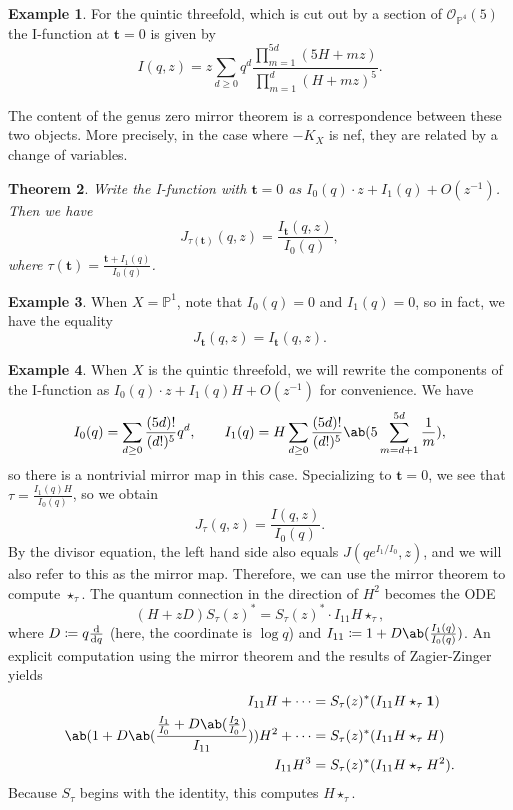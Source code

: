 \documentclass{amsart}
\newtheorem{thm}{Theorem}[section]
\theoremstyle{definition}
\newtheorem{exm}[thm]{Example}
\theoremstyle{remark}
\theoremstyle{plain}
\theoremstyle{definition}
\theoremstyle{remark}
\renewcommand{\P}{\mathbb{P}}
\newcommand{\mc}[1]{\mathcal{#1}}
\newcommand{\mbf}[1]{\mathbf{#1}}
\newcommand{\1}{\mathbf{1}}
\newcommand{\2}{\mathbf{2}}
\newcommand{\3}{\mathbf{3}}
\begin{document}
\begin{exm}
    For the quintic threefold, which is cut out by a section of \(\mc{O}_{\P^4}(5)\)  the I-function at \(\mbf{t} = 0\) is given by
    \[ I(q,z) = z \sum_{d \geq 0} q^d \frac{\prod_{m=1}^{5d}(5H+mz)}{\prod_{m=1}^d (H+mz)^5}. \]
\end{exm}

The content of the genus zero mirror theorem is a correspondence between these two objects. More precisely, in the case where \(-K_X\) is nef, they are related by a change of variables.

\begin{thm}
    Write the I-function with \(\mbf{t} = 0\) as \(I_0(q) \cdot z + I_1(q) + O(z^{-1})\). Then we have 
    \[
        J_{\tau(\mbf{t})}(q,z) = \frac{I_{\mbf{t}}(q,z)}{I_0(q)},
    \]
    where \(\tau(\mbf{t}) = \frac{\mbf{t} + I_1(q)}{I_0(q)}\). 
\end{thm}

\begin{exm}
    When \(X = \P^1\), note that \(I_0(q) = 0\) and \(I_1(q) = 0\), so in fact, we have the equality
    \[ J_{\mbf{t}}(q,z) = I_{\mbf{t}}(q,z). \]
\end{exm}

\begin{exm}
    When \(X\) is the quintic threefold, we will rewrite the components of the I-function as \(I_0(q) \cdot z + I_1(q)H + O(z^{-1})\) for convenience. We have
    \[ I_0(q) = \sum_{d \geq 0} \frac{(5d)!}{(d!)^5} q^d, \qquad I_1(q) = H \sum_{d \geq 0} \frac{(5d)!}{(d!)^5} \ab(5\sum_{m=d+1}^{5d} \frac{1}{m}), \]
    so there is a nontrivial mirror map in this case. Specializing to \(\mbf{t} = 0\), we see that \(\tau = \frac{I_1(q)H}{I_0(q)}\), so we obtain
    \[ J_{\tau}(q,z) = \frac{I(q,z)}{I_0(q)}. \]
    By the divisor equation, the left hand side also equals \(J(qe^{I_1/I_0}, z)\), and we will also refer to this as the mirror map.  
    Therefore, we can use the mirror theorem to compute $\star_{\tau}$. The quantum connection in the direction of \(H^2\) becomes the ODE
    \[ (H+zD) S_{\tau}(z)^* = S_{\tau}(z)^* \cdot I_{11} H \star_{\tau}, \]
    where $D \coloneqq q \odv{}{q}$ (here, the coordinate is $\log q$) and $I_{11} \coloneqq 1 + D \ab(\frac{I_1(q)}{I_0(q)})$. An explicit computation using the mirror theorem and the results of Zagier-Zinger yields
    \begin{align*}
        I_{11} H + \cdots &= S_{\tau}(z)^* (I_{11} H \star_{\tau} \1) \\
        \ab( 1 + D\ab(\frac{\frac{I_1}{I_0} + D \ab(\frac{I_2}{I_0})}{I_{11}}) ) H^2 + \cdots &= S_{\tau}(z)^* (I_{11} H \star_{\tau} H) \\
        I_{11} H^3 &= S_{\tau}(z)^* (I_{11}H \star_{\tau} H^2).
    \end{align*}
    Because $S_{\tau}$ begins with the identity, this computes $H \star_{\tau}$.
\end{exm}
\end{document}
